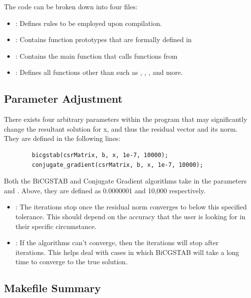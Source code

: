 \documentclass[12pt]{article}
\begin{document}
	The code can be broken down into four files:
	
	\begin{itemize}
		\item {}: Defines rules to be employed upon compilation.
		\item {}: Contains function prototypes that are formally defined in 
		\item {}: Contains the main function that calls functions from 
		\item {}: Defines all functions other than  such as , , , and more.
	\end{itemize}

\subsection{Parameter Adjustment}
 
        There exists four arbitrary parameters within the program that may significantly change the resultant solution for x, and thus the residual vector and its norm. They are defined in the following lines:
	\begin{lstlisting}
		bicgstab(csrMatrix, b, x, 1e-7, 10000);
		conjugate_gradient(csrMatrix, b, x, 1e-7, 10000);
	\end{lstlisting}
Both the BiCGSTAB and Conjugate Gradient algorithms take in the parameters  and . Above, they are defined as 0.0000001 and 10,000 respectively.
 
 \begin{itemize}
     \item {}: The iterations stop once the residual norm converges to below this specified tolerance. This should depend on the accuracy that the user is looking for in their specific circumstance.
     \item {}: If the algorithms can't converge, then the iterations will stop after  iterations. This helps deal with cases in which BiCGSTAB will take a long time to converge to the true solution.
 \end{itemize}
	
	\subsection{Makefile Summary}
	
\end{document}

